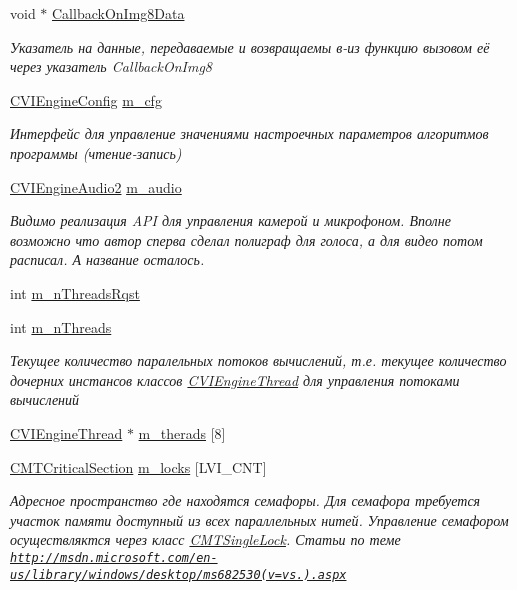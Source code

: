 \begin{DoxyCompactItemize}
void $\ast$ \hyperlink{class_c_v_i_engine_base_abfaf1ec8dec9a82c896a90c708dfd756}{Callback\+On\+Img8\+Data}
\begin{DoxyCompactList}\small\item\em Указатель на данные, передаваемые и возвращаемы в-\/из функцию вызовом её через указатель Callback\+On\+Img8 \end{DoxyCompactList}\item 
\hyperlink{class_c_v_i_engine_config}{C\+V\+I\+Engine\+Config} \hyperlink{class_c_v_i_engine_base_a867f7342010985b0b21beb4feaf354b8}{m\+\_\+cfg}
\begin{DoxyCompactList}\small\item\em Интерфейс для управление значениями настроечных параметров алгоритмов программы (чтение-\/запись) \end{DoxyCompactList}\item 
\hyperlink{class_c_v_i_engine_audio2}{C\+V\+I\+Engine\+Audio2} \hyperlink{class_c_v_i_engine_base_af996670eec8597e3529bfd0a2ec2585e}{m\+\_\+audio}
\begin{DoxyCompactList}\small\item\em Видимо реализация A\+P\+I для управления камерой и микрофоном. Вполне возможно что автор сперва сделал полиграф для голоса, а для видео потом расписал. А название осталось. \end{DoxyCompactList}\item 
int \hyperlink{class_c_v_i_engine_base_a36e1cc3cb814a08af53e9b4076b51dae}{m\+\_\+n\+Threads\+Rqst}
\item 
int \hyperlink{class_c_v_i_engine_base_a0041ab05a40ba6a0bca65c78ea9d8189}{m\+\_\+n\+Threads}
\begin{DoxyCompactList}\small\item\em Текущее количество паралельных потоков вычислений, т.\+е. текущее количество дочерних инстансов классов \hyperlink{class_c_v_i_engine_thread}{C\+V\+I\+Engine\+Thread} для управления потоками вычислений \end{DoxyCompactList}\item 
\hyperlink{class_c_v_i_engine_thread}{C\+V\+I\+Engine\+Thread} $\ast$ \hyperlink{class_c_v_i_engine_base_a4fdf197fd70d474cf4365abba485c461}{m\+\_\+therads} \mbox{[}8\mbox{]}
\item 
\hyperlink{class_c_m_t_critical_section}{C\+M\+T\+Critical\+Section} \hyperlink{class_c_v_i_engine_base_a66562cd6aaf7fd0f9ade29c9096b9851}{m\+\_\+locks} \mbox{[}L\+V\+I\+\_\+\+C\+N\+T\mbox{]}
\begin{DoxyCompactList}\small\item\em Адресное пространство где находятся семафоры. Для семафора требуется участок памяти доступный из всех параллельных нитей. Управление семафором осуществляктся через класс \hyperlink{class_c_m_t_single_lock}{C\+M\+T\+Single\+Lock}. Статьи по теме \href{http://msdn.microsoft.com/en-us/library/windows/desktop/ms682530(v=vs.85).aspx}{\tt http\+://msdn.\+microsoft.\+com/en-\/us/library/windows/desktop/ms682530(v=vs.).\+aspx} \end{DoxyCompactList}\item 

\end{DoxyCompactItemize}

